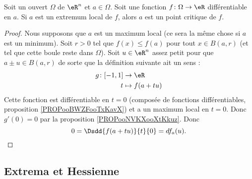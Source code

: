 \begin{proposition} \label{PropUQRooPgJsuz}
    Soit un ouvert \( \Omega\) de \( \eR^n\) et \( a\in \Omega\). Soit une fonction \( f\colon \Omega\to \eR\) différentiable en \( a\). Si \( a\) est un extremum local de \( f\), alors \( a\) est un point critique de \( f\).
\end{proposition}

\begin{proof}
    Nous supposons que \( a\) est un maximum local (ce sera la même chose si \( a\) est un minimum). Soit \( r>0\) tel que \( f(x)\leq f(a)\) pour tout \( x\in B(a,r)\) (et tel que cette boule reste dans \( \Omega\)). Soit \( u\in \eR^n\) assez petit pour que \( a\pm u\in B(a,r)\) de sorte que la définition suivante ait un sens :
    \begin{equation}
        \begin{aligned}
            g\colon \mathopen[ -1 , 1 \mathclose]&\to \eR \\
            t&\mapsto f(a+tu) 
        \end{aligned}
    \end{equation}
    Cette fonction est différentiable en \( t=0\) (composée de fonctions différentiables, proposition \ref{PROPooBWZFooTxKavX}) et a un maximum local en \( t=0\). Donc \( g'(0)=0\) par la proposition \ref{PROPooNVKXooXtKkuz}. Donc
    \begin{equation}
        0=\Dsdd{ f(a+tu) }{t}{0}=df_a(u).
    \end{equation}
\end{proof}

\subsection{Extrema et Hessienne}

